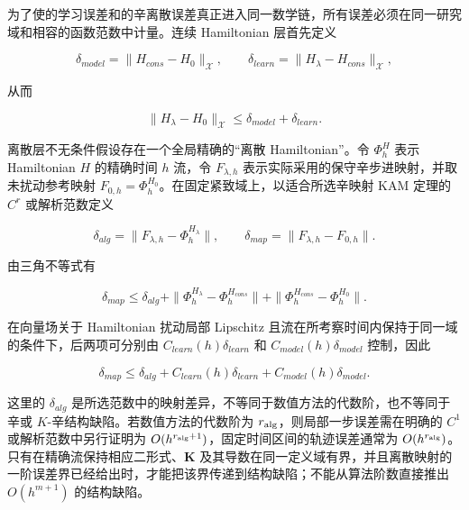 为了使的学习误差和的辛离散误差真正进入同一数学链，所有误差必须在同一研究域和相容的函数范数中计量。连续 Hamiltonian 层首先定义

\begin{equation}
\label{eq:hamiltonian-3-89}
\delta_{model} = \parallel H_{cons} - H_{0} \parallel_{\mathcal{X}},\quad\quad\delta_{learn} = \parallel H_{\lambda} - H_{cons} \parallel_{\mathcal{X}},
\end{equation}

从而

\begin{equation}
\label{eq:hamiltonian-3-90}
\boxed{\parallel H_{\lambda} - H_{0} \parallel_{\mathcal{X}} \leq \delta_{model} + \delta_{learn}.}
\end{equation}

离散层不无条件假设存在一个全局精确的``离散 Hamiltonian''。令 \(\Phi_{h}^{H}\) 表示 Hamiltonian \(H\) 的精确时间 \(h\) 流，令 \(F_{\lambda,h}\) 表示实际采用的保守辛步进映射，并取未扰动参考映射 \(F_{0,h} = \Phi_{h}^{H_{0}}\)。在固定紧致域上，以适合所选辛映射 KAM 定理的 \(C^{r}\) 或解析范数定义\cite{HairerLubichWanner2006GNI,FengQin2010}

\begin{equation}
\label{eq:hamiltonian-3-91}
\delta_{alg} = \parallel F_{\lambda,h} - \Phi_{h}^{H_{\lambda}} \parallel ,\quad\quad\delta_{map} = \parallel F_{\lambda,h} - F_{0,h} \parallel .
\end{equation}

由三角不等式有

\begin{equation}
\label{eq:hamiltonian-3-92}
\boxed{\delta_{map} \leq \delta_{alg} + \parallel \Phi_{h}^{H_{\lambda}} - \Phi_{h}^{H_{cons}} \parallel + \parallel \Phi_{h}^{H_{cons}} - \Phi_{h}^{H_{0}} \parallel .}
\end{equation}

在向量场关于 Hamiltonian 扰动局部 Lipschitz 且流在所考察时间内保持于同一域的条件下，后两项可分别由 \(C_{learn}(h)\delta_{learn}\) 和 \(C_{model}(h)\delta_{model}\) 控制，因此

\begin{equation}
\label{eq:hamiltonian-3-93}
\boxed{\delta_{map} \leq \delta_{alg} + C_{learn}(h)\delta_{learn} + C_{model}(h)\delta_{model}.}
\end{equation}

这里的 \(\delta_{alg}\) 是所选范数中的映射差异，不等同于数值方法的代数阶，也不等同于辛或 \(K\)-辛结构缺陷。若数值方法的代数阶为 \(r_{\rm alg}\)，则局部一步误差需在明确的 \(C^{1}\) 或解析范数中另行证明为 \(O(h^{r_{\rm alg}+1})\)，固定时间区间的轨迹误差通常为 \(O(h^{r_{\rm alg}})\)。只有在精确流保持相应二形式、\(\mathbf{K}\) 及其导数在同一定义域有界，并且离散映射的一阶误差界已经给出时，才能把该界传递到结构缺陷；不能从算法阶数直接推出 \(O(h^{m+1})\) 的结构缺陷。

